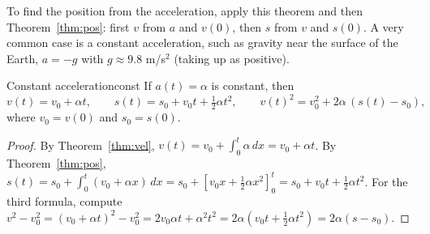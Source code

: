 \documentclass[11pt]{article}
\begin{document}
To find the position from the acceleration, apply this theorem and then Theorem~\ref{thm:pos}: first $v$ from $a$ and $v(0)$, then $s$ from $v$ and $s(0)$. A very common case is a constant acceleration, such as gravity near the surface of the Earth, $a=-g$ with $g\approx9.8$ m/s$^2$ (taking up as positive).

\begin{thm}{Constant acceleration}{const}
If $a(t)=\alpha$ is constant, then
\[
v(t)=v_0+\alpha t,\qquad s(t)=s_0+v_0t+\tfrac12\alpha t^2,\qquad v(t)^2=v_0^2+2\alpha\,(s(t)-s_0),
\]
where $v_0=v(0)$ and $s_0=s(0)$.
\end{thm}
\begin{proof}
By Theorem~\ref{thm:vel}, $v(t)=v_0+\int_0^t\alpha\,dx=v_0+\alpha t$. By Theorem~\ref{thm:pos}, $s(t)=s_0+\int_0^t(v_0+\alpha x)\,dx=s_0+\left[v_0x+\frac12\alpha x^2\right]_0^t=s_0+v_0t+\frac12\alpha t^2$. For the third formula, compute $v^2-v_0^2=(v_0+\alpha t)^2-v_0^2=2v_0\alpha t+\alpha^2t^2=2\alpha\left(v_0t+\tfrac12\alpha t^2\right)=2\alpha(s-s_0)$.
\end{proof}
\end{document}
